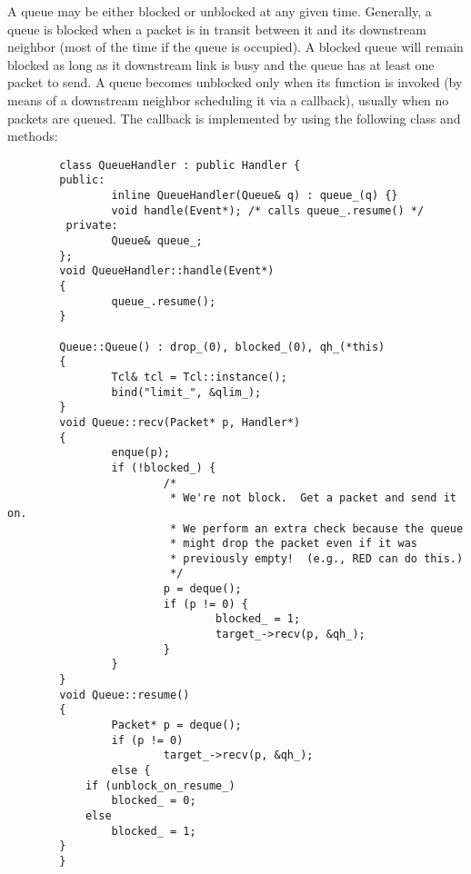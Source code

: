 A queue may be either blocked or unblocked at any given time.
Generally, a queue is blocked when a packet is in transit between it
and its downstream neighbor (most of the time if the queue is occupied).
A blocked queue will remain blocked as long as it downstream link is
busy and the queue has at least one packet to send.
A queue becomes unblocked only when its  function is
invoked (by means of a downstream neighbor scheduling it via
a callback), usually when no packets are queued.
The callback is implemented by using the following class and
methods:
\begin{small}
\begin{verbatim}
        class QueueHandler : public Handler {
        public:
                inline QueueHandler(Queue& q) : queue_(q) {}
                void handle(Event*); /* calls queue_.resume() */
         private:
                Queue& queue_;
        };
        void QueueHandler::handle(Event*)
        {
                queue_.resume();
        }

        Queue::Queue() : drop_(0), blocked_(0), qh_(*this)
        {
                Tcl& tcl = Tcl::instance();
                bind("limit_", &qlim_);
        }
        void Queue::recv(Packet* p, Handler*)
        {
                enque(p);
                if (!blocked_) {
                        /*
                         * We're not block.  Get a packet and send it on.
                         * We perform an extra check because the queue
                         * might drop the packet even if it was
                         * previously empty!  (e.g., RED can do this.)
                         */
                        p = deque();
                        if (p != 0) {
                                blocked_ = 1;
                                target_->recv(p, &qh_);
                        }
                }
        }
        void Queue::resume()
        {
                Packet* p = deque();
                if (p != 0)
                        target_->recv(p, &qh_);
                else {
			if (unblock_on_resume_)
				blocked_ = 0;
			else
				blocked_ = 1;
		}
        }
\end{verbatim}
\end{small}

